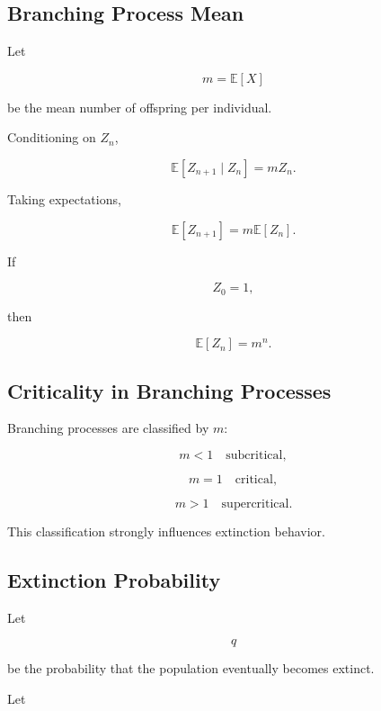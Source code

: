 \subsection{Branching Process Mean}
\label{subsec:branching-process-mean}

Let

\[
m
=
\mathbb{E}[X]
\]

be the mean number of offspring per individual.

Conditioning on \(Z_n\),

\[
\mathbb{E}[Z_{n+1}\mid Z_n]
=
mZ_n.
\]

Taking expectations,

\[
\mathbb{E}[Z_{n+1}]
=
m\mathbb{E}[Z_n].
\]

If

\[
Z_0=1,
\]

then

\[
\boxed{
\mathbb{E}[Z_n]
=
m^n.
}
\]

\subsection{Criticality in Branching Processes}
\label{subsec:branching-criticality}

Branching processes are classified by \(m\):

\[
\boxed{
m<1
\quad
\text{subcritical},
}
\]

\[
\boxed{
m=1
\quad
\text{critical},
}
\]

\[
\boxed{
m>1
\quad
\text{supercritical}.
}
\]

This classification strongly influences extinction behavior.

\subsection{Extinction Probability}
\label{subsec:branching-extinction}

Let

\[
q
\]

be the probability that the population eventually becomes extinct.

Let


